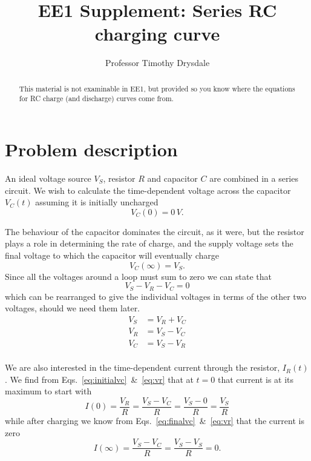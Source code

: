 \documentclass{tufte-handout}
\title{EE1 Supplement: Series RC charging curve}
\author{Professor Timothy Drysdale}
\begin{document}
\maketitle
\begin{abstract}
This material is not examinable in EE1, but provided so you know where the equations for RC charge (and discharge) curves come from.
\end{abstract}

\section{Problem description}
An ideal voltage source $V_S$, resistor $R$ and capacitor $C$ are combined in a series circuit. We wish to calculate the time-dependent voltage across the capacitor $V_C(t)$ assuming it is initially uncharged 
\begin{equation}
\label{eq:initialvc}
V_C(0) = 0\,V.
\end{equation}
\begin{marginfigure}

\end{marginfigure}
The behaviour of the capacitor dominates the circuit, as it were, but the resistor plays a role in determining the rate of charge, and the supply voltage sets the final voltage to which the capacitor will eventually charge
\begin{equation}
\label{eq:finalvc}
V_C(\infty) = V_S.
\end{equation}
Since all the voltages around a loop must sum to zero we can state that
\begin{equation}
V_S -V_R - V_C = 0 
\end{equation}
which can be rearranged to give the individual voltages in terms of the other two voltages, should we need them later.
\begin{align}
V_S & = V_R + V_C \label{eq:vs}\\
V_R & = V_S - V_C \label{eq:vr}\\
V_C & = V_S - V_R \label{eq:vc}\\
\end{align}

We are also interested in the time-dependent current through  the resistor, $I_R(t)$. We find from Eqs.~\ref{eq:initialvc}~\&~\ref{eq:vr} that at $t=0$ that current is at its maximum to start with
\begin{equation}
I(0) = \frac{V_R}{R} = \frac{V_S-V_C}{R} = \frac{V_S-0}{R} = \frac{V_S}{R}
\end{equation}
while after charging we know from Eqs.~\ref{eq:finalvc}~\&~\ref{eq:vr} that the current is zero
\begin{equation}
I(\infty) = \frac{V_S-V_C}{R} = \frac{V_S-V_S}{R} = 0.
\end{equation}
\end{document}
